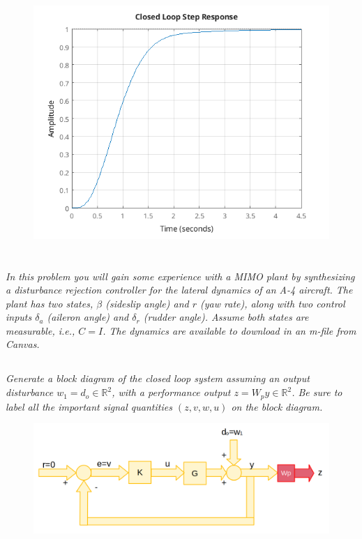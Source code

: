 \documentclass{article}
\begin{document}
\begin{figure}[H]
    \centering
    \includegraphics[width=\textwidth]{uasStep.png}
\end{figure}

\section{}
\textit{In this problem you will gain some experience with a MIMO plant by synthesizing a disturbance rejection controller for the lateral dynamics of an A-4 aircraft. The plant has two states, $\beta$ (sideslip angle) and $r$ (yaw rate), along with two control inputs $\delta_a$ (aileron angle) and $\delta_r$ (rudder angle). Assume both states are measurable, i.e., $C = I$. The dynamics are available to download in an m-file from Canvas.}
    
\subsection{}
\textit{Generate a block diagram of the closed loop system assuming an output disturbance $w_1 = d_o \in \mathbb{R}^2$, with a performance output $z = W_p y \in \mathbb{R}^2$. Be sure to label all the important signal quantities $(z, v, w, u)$ on the block diagram.}

\begin{figure}[H]
    \centering
    \includegraphics[width=\textwidth]{a4block.png}
\end{figure}
\end{document}

